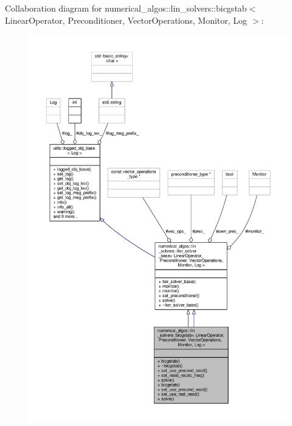 Collaboration diagram for numerical\-\_\-algos\-:\-:lin\-\_\-solvers\-:\-:bicgstab$<$ Linear\-Operator, Preconditioner, Vector\-Operations, Monitor, Log $>$\-:
\nopagebreak
\begin{figure}[H]
\begin{center}
\leavevmode
\includegraphics[width=350pt]{classnumerical__algos_1_1lin__solvers_1_1bicgstab__coll__graph}
\end{center}
\end{figure}
